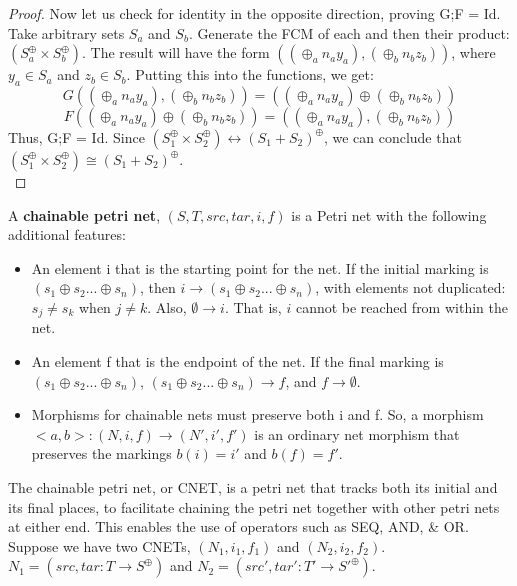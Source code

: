 \begin{lemma}
\begin{proof}
Now let us check for identity in the opposite direction, proving G;F = Id.\\
Take arbitrary sets $S_a$ and $S_b$. Generate the FCM of each and then their product: $(S_a^\oplus \times S_b^\oplus)$. The result will have the form $((\oplus_a n_a y_a), (\oplus_b n_b z_b))$, where $y_a \in S_a$ and $z_b \in S_b$. Putting this into the functions, we get:\\ 
\[G((\oplus_a n_a y_a), (\oplus_b n_b z_b)) = ((\oplus_a n_a y_a) \oplus (\oplus_b n_b z_b))\] 
\[F((\oplus_a n_a y_a) \oplus (\oplus_b n_b z_b)) = ((\oplus_a n_a y_a), (\oplus_b n_b z_b))\]
Thus, G;F = Id. 
Since $(S_1 ^\oplus \times S_2 ^\oplus) \leftrightarrow (S_1 + S_2)^\oplus$, we can conclude that $(S_1 ^\oplus \times S_2 ^\oplus) \cong (S_1 + S_2)^\oplus$.\\
\end{proof}
%
\end{lemma}
%
\begin{definition}
  \label{Chainable-Petri-Net}
  A \textbf{chainable petri net}, $(S, T, src, tar, i, f)$ is a Petri net with the following additional features: 
  \begin{itemize}
  \item An element i that is the starting point for the net. If the initial marking is $(s_1 \oplus s_2 ... \oplus s_n)$, then $i \to (s_1 \oplus s_2 ... \oplus s_n)$, with elements not duplicated: $s_j \neq s_k$ when $j \neq k$. Also, $\emptyset \to i$. That is, $i$ cannot be reached from within the net. 
  \item An element f that is the endpoint of the net. If the final marking is $(s_1 \oplus s_2 ... \oplus s_n)$, $(s_1 \oplus s_2 ... \oplus s_n) \to f$, and $f \to \emptyset$. 
   \item Morphisms for chainable nets must preserve both i and f. So, a morphism $<a,b>: (N, i, f) \to (N', i', f')$ is an ordinary net morphism that preserves the markings $b(i) = i'$ and $b(f) = f'$. 
 \end{itemize}
\end{definition}
The chainable petri net, or CNET, is a petri net that tracks both its initial and its final places, to facilitate chaining the petri net together with other petri nets at either end. This enables the use of operators such as SEQ, AND, \& OR.\\
Suppose we have two CNETs, $(N_1, i_1, f_1)$ and $(N_2, i_2, f_2)$. \\
$N_1 = (src, tar: T \to S^\oplus)$ and $N_2 = (src', tar': T' \to S'^\oplus)$.\bigskip\\
